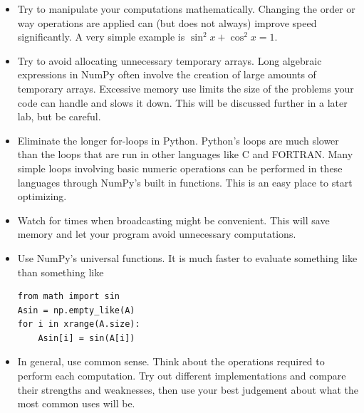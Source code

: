 \begin{itemize}

\item Try to manipulate your computations mathematically.
Changing the order or way operations are applied can (but does not always) improve speed significantly.
A very simple example is $\sin^2 x + \cos^2 x = 1$.

\item Try to avoid allocating unnecessary temporary arrays.
Long algebraic expressions in NumPy often involve the creation of large amounts of temporary arrays.
Excessive memory use limits the size of the problems your code can handle and slows it down.
This will be discussed further in a later lab, but be careful.

\item Eliminate the longer for-loops in Python.
Python's loops are much slower than the loops that are run in other languages like C and FORTRAN.
Many simple loops involving basic numeric operations can be performed in these languages through NumPy's built in functions.
This is an easy place to start optimizing.

\item Watch for times when broadcasting might be convenient.
This will save memory and let your program avoid unnecessary computations.

\item Use NumPy's universal functions.
It is much faster to evaluate something like  than something like
\begin{lstlisting}
from math import sin
Asin = np.empty_like(A)
for i in xrange(A.size):
    Asin[i] = sin(A[i])
\end{lstlisting}

\item In general, use common sense.
Think about the operations required to perform each computation.
Try out different implementations and compare their strengths and weaknesses, then use your best judgement about what the most common uses will be.

\end{itemize}

